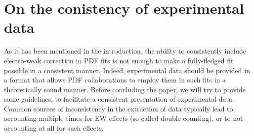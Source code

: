 \section{On the conistency of experimental data}
\label{sec:doublecounting}

As it has been mentioned in the introduction, the ability to consistently include electro-weak correction in
PDF fits is not enough to make a fully-fledged fit possible in a consistent manner. Indeed, experimental data should
be provided in  a format that allows PDF collaborations to employ them in such fits in a theoretically sound manner. Before concluding the paper,
we will try to provide some guidelines, to facilitate a consistent presentation of experimental data. Common sources of inconsistency in the extraction of data
typically lead to accounting multiple times for EW effects (so-called double counting), or to not accounting at
all for such effects.

